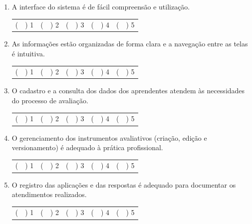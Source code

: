 \begin{enumerate}

    \item A interface do sistema é de fácil compreensão e utilização.

    \bigskip
    \noindent
    \begin{tabular}{ccccc}
        \quad(\ \ ) 1 \quad & \quad(\ \ ) 2 \quad & \quad(\ \ ) 3 \quad & \quad(\ \ ) 4 \quad & \quad(\ \ ) 5 \quad
    \end{tabular}

    \bigskip

    \item As informações estão organizadas de forma clara e a navegação entre as telas é intuitiva.

    \bigskip
    \noindent
    \begin{tabular}{ccccc}
        \quad(\ \ ) 1 \quad & \quad(\ \ ) 2 \quad & \quad(\ \ ) 3 \quad & \quad(\ \ ) 4 \quad & \quad(\ \ ) 5 \quad
    \end{tabular}

    \bigskip

    \item O cadastro e a consulta dos dados dos aprendentes atendem às necessidades do processo de avaliação.

    \bigskip
    \noindent
    \begin{tabular}{ccccc}
        \quad(\ \ ) 1 \quad & \quad(\ \ ) 2 \quad & \quad(\ \ ) 3 \quad & \quad(\ \ ) 4 \quad & \quad(\ \ ) 5 \quad
    \end{tabular}

    \bigskip

    \item O gerenciamento dos instrumentos avaliativos (criação, edição e versionamento) é adequado à prática profissional.

    \bigskip
    \noindent
    \begin{tabular}{ccccc}
        \quad(\ \ ) 1 \quad & \quad(\ \ ) 2 \quad & \quad(\ \ ) 3 \quad & \quad(\ \ ) 4 \quad & \quad(\ \ ) 5 \quad
    \end{tabular}

    \bigskip

    \item O registro das aplicações e das respostas é adequado para documentar os atendimentos realizados.

    \bigskip
    \noindent
    \begin{tabular}{ccccc}
        \quad(\ \ ) 1 \quad & \quad(\ \ ) 2 \quad & \quad(\ \ ) 3 \quad & \quad(\ \ ) 4 \quad & \quad(\ \ ) 5 \quad
    \end{tabular}


\end{enumerate}
